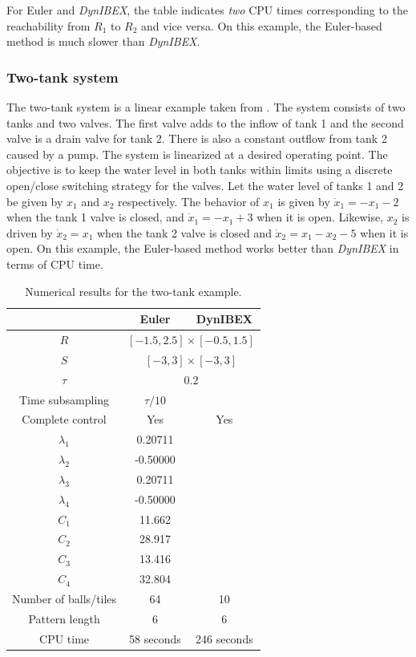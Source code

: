 For Euler and {\em DynIBEX}, the table indicates {\em two} CPU times corresponding to the reachability from $R_1$
to $R_2$ and vice versa.
On this example, the Euler-based method is much slower than {\em DynIBEX}.
 
 \subsubsection{Two-tank system}
 \label{sec:two_tank}
 
 The two-tank  system  is a linear example taken from \cite{hiskens2001stability}. The system consists of two tanks and two valves.
 The first valve adds to the inflow of tank 1 and the second valve is a drain valve for tank 2. 
 There is also a constant outflow from tank 2 caused by a pump. The system is linearized at a desired
 operating point. The objective is to keep the water level in both tanks 
 within limits using a discrete open/close switching strategy for the valves. 
 Let the water level of tanks 1 and 2 be given by $x_1$ and $x_2$ respectively. 
 The behavior of $x_1$ is given by $\dot x_1 = -x_1 - 2$ when the tank 1 valve is closed, 
 and $\dot x_1 = -x_1 + 3$ when it is open. Likewise,
 $x_2$ is driven by $\dot x_2 = x_1$ when the tank 2 valve is closed and $\dot x_2 = x_1 - x_2 - 5$ when it 
 is open. 
On this example, the Euler-based method works better than {\em DynIBEX}
in terms of CPU time.

 
 
 \begin{table}[ht]
 \centering
\begin{tabular}{|c|c|c|}
 \hline 
 &\multicolumn{1}{c|}{Euler} & \multicolumn{1}{c|}{DynIBEX} \\
\hline
$R$ & \multicolumn{2}{c|}{$[-1.5,2.5]\times[-0.5,1.5]$} \\
$S$ & \multicolumn{2}{c|}{$[-3,3]\times[-3,3]$} \\
\hline
$\tau$ & \multicolumn{2}{c|}{0.2} \\
\hline
Time subsampling & $\tau/10$ & \\
\hline
Complete control & Yes & Yes \\
\hline
$\lambda_1$  & 0.20711     &       \\
$\lambda_2$  &  -0.50000 &\\
$\lambda_3$  &  0.20711 &  \\
$\lambda_4$ &  -0.50000 & \\
$C_{1}$  &  11.662    &             \\
$C_{2}$ & 28.917&\\
$C_{3}$  &  13.416 &\\
$C_{4}$ & 32.804& \\
\hline
Number of balls/tiles & 64 & 10 \\
Pattern length & 6 & 6 \\
\hline
CPU time & 58 seconds & 246 seconds\\ \hline
  \end{tabular}
\label{table:TT}
\caption{Numerical results for the two-tank example.}
 \end{table}
 

